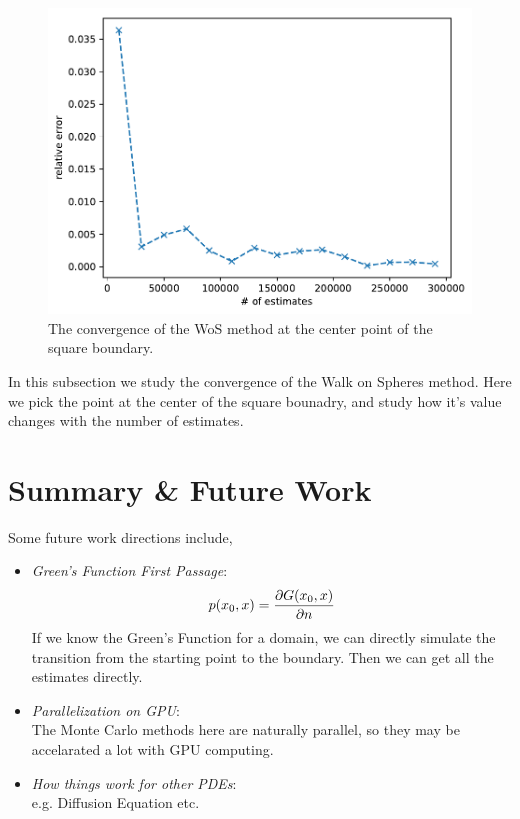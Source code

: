 \documentclass[aps, prl, preprint, groupedaddress]{revtex4-1}
\begin{document}
\begin{figure}[htbp]
    \centering
    \includegraphics[width=.8\textwidth]{./figs/err_es}
    \caption{\label{fig:err_es} The convergence of the WoS method at the center point of the square boundary.}
\end{figure}

In this subsection we study the convergence of the Walk on Spheres method. Here we pick the point at the center of the square bounadry, and study how it's value changes with the number of estimates.

\section{Summary \& Future Work}


Some future work directions include,
\begin{itemize}
    \item \emph{Green's Function First Passage}:
    \begin{equation*}
        p(x_0, x) = \pdv{G(x_0, x)}{n}
    \end{equation*}
    If we know the Green's Function for a domain, we can directly simulate the transition from the starting point to the boundary. Then we can get all the estimates directly.
    \item \emph{Parallelization on GPU}:\\
    The Monte Carlo methods here are naturally parallel, so they may be accelarated a lot with GPU computing.
    \item \emph{How things work for other PDEs}:\\
    e.g. Diffusion Equation etc.
\end{itemize}
\end{document}

